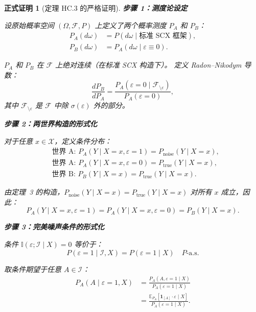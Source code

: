\documentclass[12pt,a4paper]{article}
\newtheorem{formalproof}[theorem]{正式证明}
\newcommand{\E}{\mathbb{E}}
\newcommand{\I}{\mathbb{I}}
\newcommand{\cX}{\mathcal{X}}
\newcommand{\cI}{\mathcal{I}}
\newcommand{\cF}{\mathcal{F}}
\newcommand{\ind}[1]{\mathbf{1}_{[#1]}}
\begin{document}
\begin{formalproof}[定理 HC.3 的严格证明]

\textbf{步骤 1：测度论设定}

设原始概率空间 $(\Omega, \cF, P)$ 上定义了两个概率测度 $P_A$ 和 $P_B$：
\begin{align}
    P_A(d\omega) &= P(d\omega \mid \text{标准 SCX 框架}),\\
    P_B(d\omega) &= P_A(d\omega \mid \varepsilon \equiv 0).
\end{align}

$P_A$ 和 $P_B$ 在 $\cF$ 上绝对连续（在标准 SCX 构造下）。
定义 Radon--Nikodym 导数：
\begin{equation}
    \frac{dP_B}{dP_A} = \frac{P_A(\varepsilon=0 \mid \cF_{\setminus\varepsilon})}
                           {P_A(\varepsilon=0)},
\end{equation}
其中 $\cF_{\setminus\varepsilon}$ 是 $\cF$ 中除 $\sigma(\varepsilon)$ 外的部分。

\textbf{步骤 2：两世界构造的形式化}

对于任意 $x \in \cX$，定义条件分布：
\begin{align}
    &\text{世界 A: } P_A(Y \mid X=x, \varepsilon=1) = P_{\mathrm{noise}}(Y \mid X=x),\\
    &\text{世界 A: } P_A(Y \mid X=x, \varepsilon=0) = P_{\mathrm{true}}(Y \mid X=x),\\
    &\text{世界 B: } P_B(Y \mid X=x) = P_{\mathrm{true}}(Y \mid X=x).
\end{align}

由定理~3 的构造，$P_{\mathrm{noise}}(Y \mid X=x) = P_{\mathrm{true}}(Y \mid X=x)$
对所有 $x$ 成立，因此：
\begin{equation}
    P_A(Y \mid X=x, \varepsilon=1) = P_A(Y \mid X=x, \varepsilon=0) = P_B(Y \mid X=x).
\end{equation}

\textbf{步骤 3：完美噪声条件的形式化}

条件 $\I(\varepsilon; \cI \mid X) = 0$ 等价于：
\begin{equation}
    P(\varepsilon=1 \mid \cI, X) = P(\varepsilon=1 \mid X) \quad \text{$P$-a.s.}
\end{equation}

取条件期望于任意 $A \in \cI$：
\begin{align}
    P_A(A \mid \varepsilon=1, X)
    &= \frac{P_A(A, \varepsilon=1 \mid X)}{P_A(\varepsilon=1 \mid X)} \\
    &= \frac{\E_{P_A}[\ind{A} \cdot \varepsilon \mid X]}{P_A(\varepsilon=1 \mid X)}.
\end{align}


\end{formalproof}
\end{document}
